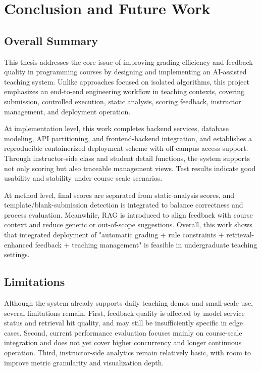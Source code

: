 ﻿\chapter{Conclusion and Future Work}


\section{Overall Summary}

This thesis addresses the core issue of improving grading efficiency and feedback quality in programming courses by designing and implementing an AI-assisted teaching system. Unlike approaches focused on isolated algorithms, this project emphasizes an end-to-end engineering workflow in teaching contexts, covering submission, controlled execution, static analysis, scoring feedback, instructor management, and deployment operation.

At implementation level, this work completes backend services, database modeling, API partitioning, and frontend-backend integration, and establishes a reproducible containerized deployment scheme with off-campus access support. Through instructor-side class and student detail functions, the system supports not only scoring but also traceable management views. Test results indicate good usability and stability under course-scale scenarios.

At method level, final scores are separated from static-analysis scores, and template/blank-submission detection is integrated to balance correctness and process evaluation. Meanwhile, RAG is introduced to align feedback with course context and reduce generic or out-of-scope suggestions. Overall, this work shows that integrated deployment of "automatic grading + rule constraints + retrieval-enhanced feedback + teaching management" is feasible in undergraduate teaching settings.

\section{Limitations}

Although the system already supports daily teaching demos and small-scale use, several limitations remain. First, feedback quality is affected by model service status and retrieval hit quality, and may still be insufficiently specific in edge cases. Second, current performance evaluation focuses mainly on course-scale integration and does not yet cover higher concurrency and longer continuous operation. Third, instructor-side analytics remain relatively basic, with room to improve metric granularity and visualization depth.

